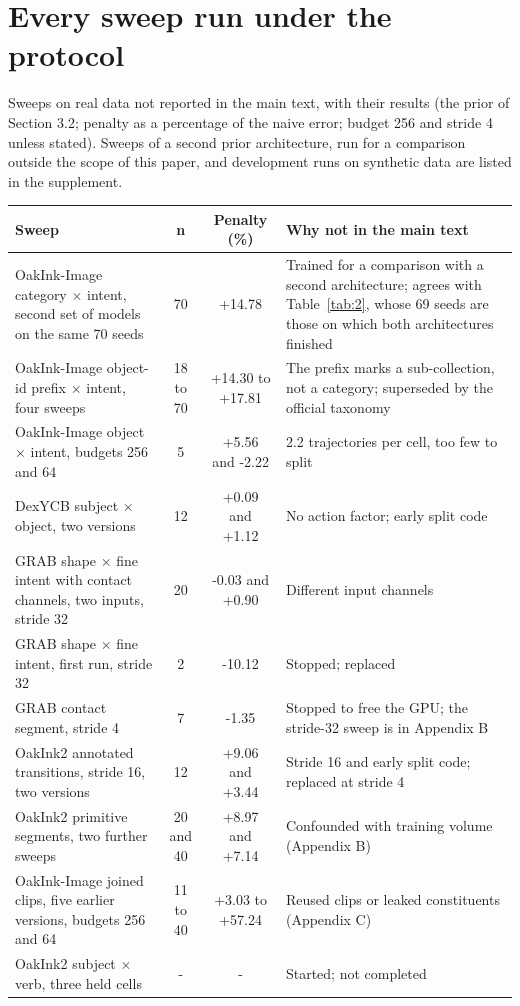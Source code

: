 \documentclass[10pt]{article}
\begin{document}
\section{Every sweep run under the protocol}

Sweeps on real data not reported in the main text, with their results (the prior of Section 3.2; penalty as a percentage of the naive error; budget 256 and stride 4 unless stated). Sweeps of a second prior architecture, run for a comparison outside the scope of this paper, and development runs on synthetic data are listed in the supplement.

{\footnotesize
\setlength{\tabcolsep}{3pt}
\begin{longtable}[c]{p{}cc p{}}
\toprule
\textbf{Sweep} & \textbf{n} & \textbf{Penalty (\%)} & \textbf{Why not in the main text} \\
\midrule
\endhead
\bottomrule
\endlastfoot
OakInk-Image category $\times$ intent, second set of models on the same 70 seeds & 70 & +14.78 & Trained for a comparison with a second architecture; agrees with Table~\ref{tab:2}, whose 69 seeds are those on which both architectures finished \\
OakInk-Image object-id prefix $\times$ intent, four sweeps & 18 to 70 & +14.30 to +17.81 & The prefix marks a sub-collection, not a category; superseded by the official taxonomy \\
OakInk-Image object $\times$ intent, budgets 256 and 64 & 5 & +5.56 and -2.22 & 2.2 trajectories per cell, too few to split \\
DexYCB subject $\times$ object, two versions & 12 & +0.09 and +1.12 & No action factor; early split code \\
GRAB shape $\times$ fine intent with contact channels, two inputs, stride 32 & 20 & -0.03 and +0.90 & Different input channels \\
GRAB shape $\times$ fine intent, first run, stride 32 & 2 & -10.12 & Stopped; replaced \\
GRAB contact segment, stride 4 & 7 & -1.35 & Stopped to free the GPU; the stride-32 sweep is in Appendix B \\
OakInk2 annotated transitions, stride 16, two versions & 12 & +9.06 and +3.44 & Stride 16 and early split code; replaced at stride 4 \\
OakInk2 primitive segments, two further sweeps & 20 and 40 & +8.97 and +7.14 & Confounded with training volume (Appendix B) \\
OakInk-Image joined clips, five earlier versions, budgets 256 and 64 & 11 to 40 & +3.03 to +57.24 & Reused clips or leaked constituents (Appendix C) \\
OakInk2 subject $\times$ verb, three held cells & - & - & Started; not completed \\
\end{longtable}}
\end{document}
